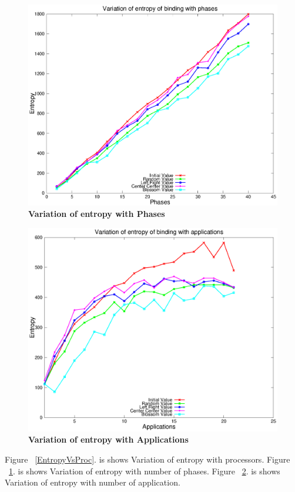 \documentclass[10pt, conference]{IEEEtran}
\begin{document}
\begin{figure} [tb]
\centering
\includegraphics[scale=0.45]{figure/data2.eps}
\caption{\textbf{Variation of entropy with Phases}}
\label{EntropyVsPhases}
\end{figure}

\begin{figure} [tb]
\centering
\includegraphics[scale=0.45]{figure/data3.eps}
\caption{\textbf{Variation of entropy with Applications}}
\label{EntropyVsApps}
\end{figure}

Figure ~\ref{EntropyVsProc}. is shows Variation of entropy with processors. Figure ~\ref{EntropyVsPhases}. is shows Variation of entropy with number of phases. Figure ~\ref{EntropyVsApps}. is shows Variation of entropy with number of application.
\end{document}
